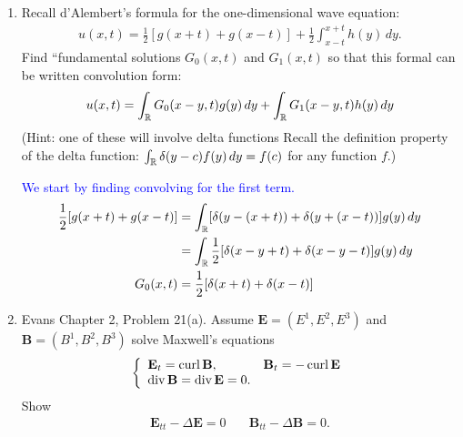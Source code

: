 \documentclass[10pt,a4paper]{report}
\newcommand{\BLUE}[1]{\textcolor{blue}{#1}}
\newcommand{\CURL}{\operatorname{curl}}
\newcommand{\DIV}{\operatorname{div}}
\begin{document}
\begin{enumerate}
\BLUE{
Applying the initial conditions and recall that $	u(x,t) = F(x+t) + G(x-t) = 0$
\begin{align*}
	F(x+t) &= -G(x-t) \\ 
	u(x,0) &= F(x)+G(x) = 0 \implies F(x) = - G(x) & (*)\\
	u(0,t) &= F(t)+G(-t) = h(t) \\
	u(0,t) &= F(-t)+G(t) = h(t) \text{  for } x< t
\end{align*}Taking the first partial with respect to $t$
\begin{align*}
	u_t(x,t) &= F'(x+t)-G'(x-t)\\
	u_t(x,0) &= F'(x)-G(x)=0 \implies F'(x) = G'(x)
\end{align*}but from $(*)$ above we have $F'(x) = -G'(x) = -F'(x)$.  Therefore $F'(x)=0$ and $F(x)$ is a constant.  That leaves $G(x-t)$ which only makes sense when $x\ge t$.  Hence,
\begin{align*}
	u(x,t) &= \BINDEF{h(x,t) & x \ge t}{0 & x <0}
\end{align*}
}

\item Recall d'Alembert's formula for the one-dimensional wave equation:
\begin{align*}
	u(x,t) = \frac{1}{2}[g(x+t)+g(x-t)] + \frac{1}{2}\int_{x-t}^{x+t} h(y)\, dy.
\end{align*}Find ``fundamental solutions $G_0(x,t)$ and $G_1(x,t)$ so that this formal can be written convolution form:
\begin{align*}
	u(x,t) = \int_{\mathbb{R}} G_0(x-y,t)g(y)\,dy+\int_{\mathbb{R}} G_1(x-y,t)h(y)\,dy
\end{align*}(Hint:  one of these will involve delta functions Recall the definition property of the delta function: $\int_{\mathbb{R}}\delta(y-c)f(y)\,dy=f(c)$ for any function $f$.)

\BLUE{
We start by finding convolving for the first term.
\begin{align*}
	\frac{1}{2}[g(x+t)+g(x-t)] &= \int_{\mathbb{R}} [\delta(y-(x+t))+\delta(y+(x-t))]g(y)\,dy \\
	&= \int_{\mathbb{R}} \frac{1}{2}[\delta(x-y+t)+\delta(x-y-t)]g(y)\,dy \\
	G_0 (x,t) &= \frac{1}{2}[\delta(x+t)+\delta(x-t)]
\end{align*}
}

\newcommand{\EE}{\textbf{E}}
\newcommand{\BB}{\textbf{B}}
\item Evans Chapter 2, Problem 21(a).  Assume $\EE=(E^1,E^2,E^3)$ and $\BB= (B^1, B^2, B^3)$ solve Maxwell's equations
\begin{align*}
	\BINDEF{\EE_t = \CURL\BB, & \BB_t = -\CURL \EE}{\DIV \BB = \DIV \EE = 0.}
\end{align*}Show \begin{align*}
	\EE_{tt}-\Delta \EE = 0 & \quad \BB_{tt} - \Delta \BB = 0.
\end{align*}


\end{enumerate}
\end{document}

